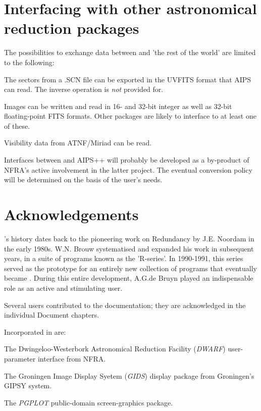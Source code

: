 \section{ Interfacing with other astronomical reduction packages }
\label{.interfacing}

	The possibilities to exchange data between \NEWSTAR and 'the rest of
the world' are limited to the following:

\bi
\item   The sectors from a .SCN file can be exported in the UVFITS format that
AIPS can read. The inverse operation is {\em not} provided for.

\item   Images can be written and read in 16- and 32-bit integer as well as
32-bit floating-point FITS formats. Other packages are likely to interface to
at least one of these.

\item   Visibility data from ATNF/Miriad can be read.

\item   Interfaces between \NEWSTAR and AIPS++ will probably be developed as a
by-product of NFRA's active involvement in the latter project. The eventual
conversion policy will be determined on the basis of the user's needs.
\ei


\section{ Acknowledgements }

	\NEWSTAR's history dates back to the pioneering work on Redundancy by
J.E. Noordam in the early 1980s. W.N. Brouw systematised and expanded his work
in subsequent years, in a suite of programs known as the 'R-series'. In
1990-1991, this series served as the prototype for an entirely new collection
of programs that eventually became \NEWSTAR. During this entire development,
A.G.de Bruyn played an indispensable role as an active and stimulating user.

	Several users contributed to the documentation; they are acknowledged
in the individual Document chapters.

	Incorporated in \NEWSTAR are:

\bi
\item   The Dwingeloo-Westerbork Astronomical Reduction Facility ({\em DWARF})
user-parameter interface from NFRA.

\item   The Groningen Image Display Syetem ({\em GIDS}) display package from
Groningen's GIPSY system.

\item   The {\em PGPLOT} public-domain screen-graphics package.
\ei


